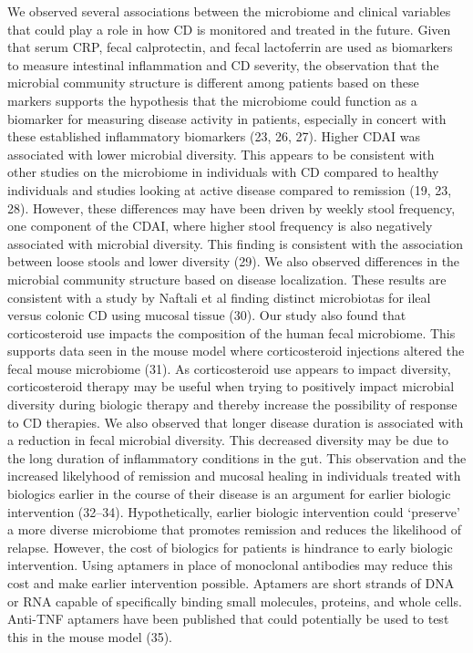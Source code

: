 \documentclass[11pt,]{article}
\begin{document}
We observed several associations between the microbiome and clinical
variables that could play a role in how CD is monitored and treated in
the future. Given that serum CRP, fecal calprotectin, and fecal
lactoferrin are used as biomarkers to measure intestinal inflammation
and CD severity, the observation that the microbial community structure
is different among patients based on these markers supports the
hypothesis that the microbiome could function as a biomarker for
measuring disease activity in patients, especially in concert with these
established inflammatory biomarkers (23, 26, 27). Higher CDAI was
associated with lower microbial diversity. This appears to be consistent
with other studies on the microbiome in individuals with CD compared to
healthy individuals and studies looking at active disease compared to
remission (19, 23, 28). However, these differences may have been driven
by weekly stool frequency, one component of the CDAI, where higher stool
frequency is also negatively associated with microbial diversity. This
finding is consistent with the association between loose stools and
lower diversity (29). We also observed differences in the microbial
community structure based on disease localization. These results are
consistent with a study by Naftali et al finding distinct microbiotas
for ileal versus colonic CD using mucosal tissue (30). Our study also
found that corticosteroid use impacts the composition of the human fecal
microbiome. This supports data seen in the mouse model where
corticosteroid injections altered the fecal mouse microbiome (31). As
corticosteroid use appears to impact diversity, corticosteroid therapy
may be useful when trying to positively impact microbial diversity
during biologic therapy and thereby increase the possibility of response
to CD therapies. We also observed that longer disease duration is
associated with a reduction in fecal microbial diversity. This decreased
diversity may be due to the long duration of inflammatory conditions in
the gut. This observation and the increased likelyhood of remission and
mucosal healing in individuals treated with biologics earlier in the
course of their disease is an argument for earlier biologic intervention
(32--34). Hypothetically, earlier biologic intervention could `preserve'
a more diverse microbiome that promotes remission and reduces the
likelihood of relapse. However, the cost of biologics for patients is
hindrance to early biologic intervention. Using aptamers in place of
monoclonal antibodies may reduce this cost and make earlier intervention
possible. Aptamers are short strands of DNA or RNA capable of
specifically binding small molecules, proteins, and whole cells.
Anti-TNF aptamers have been published that could potentially be used to
test this in the mouse model (35).
\end{document}
